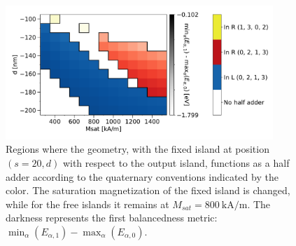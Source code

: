 \documentclass[11pt,a4paper,english]{article}
\begin{document}
\begin{figure}
    \centering
    \includegraphics[width=0.9\textwidth]{Figures/half_adder/sweep/000006_d-Msat/table(d100-200_10,Msat3e5-15e5_1e5)_balanced1.pdf}
    \caption{Regions where the geometry, with the fixed island at position $(s=20, d)$ with respect to the output island, functions as a half adder according to the quaternary conventions indicated by the color. The saturation magnetization of the fixed island is changed, while for the free islands it remains at $M_{sat} = \SI{800}{\kilo\ampere\per\metre}$. The darkness represents the first balancedness metric: $\min_\alpha(E_{\alpha,1}) - \max_\alpha(E_{\alpha,0})$.} 
    \label{fig:HalfAdder_000006_sweep_d-Msat_balanced1}
\end{figure} %
\end{document}
